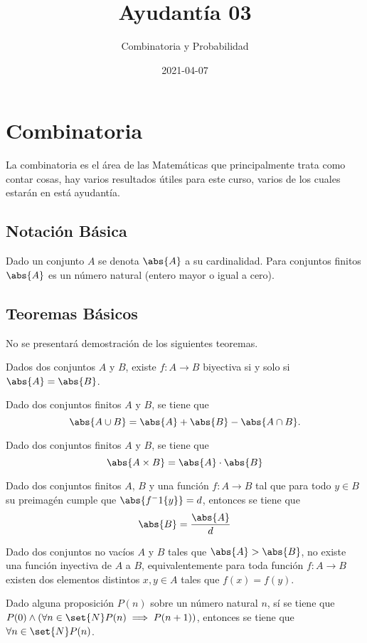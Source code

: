 \documentclass{ayudantia}
\title{Ayudantía 03}
\subtitle{Combinatoria y Probabilidad}
\date{2021-04-07}
\begin{document}
\maketitle
\section{Combinatoria}
La combinatoria es el área de las Matemáticas que principalmente trata como contar cosas, hay varios resultados útiles para este curso, varios de los cuales estarán en está ayudantía.
\subsection{Notación Básica}
\begin{defn}[Cardinalidad]
    Dado un conjunto \(A\) se denota \(\abs{A}\) a su cardinalidad. Para conjuntos finitos \(\abs{A}\) es un número natural (entero mayor o igual a cero).
\end{defn}
\subsection{Teoremas Básicos}
No se presentará demostración de los siguientes teoremas.
\begin{thm}[Biyección]
    Dados dos conjuntos \(A\) y \(B\), existe \(f:A\rightarrow B\) biyectiva si y solo si \(\abs{A}=\abs{B}\).
\end{thm}
\begin{thm}
    Dado dos conjuntos finitos \(A\) y \(B\), se tiene que 
    \begin{equation*}
        \abs{A\cup B}=\abs{A}+\abs{B}-\abs{A\cap B}.
    \end{equation*}
\end{thm}
\begin{thm}
    Dado dos conjuntos finitos \(A\) y \(B\), se tiene que
    \begin{equation*}
        \abs{A\times B}=\abs{A}\cdot\abs{B}
    \end{equation*}
\end{thm}
\begin{thm}
    Dado dos conjuntos finitos \(A\), \(B\) y una función \(f:A\rightarrow B\) tal que para todo \(y\in B\) su preimagén cumple que \(\abs{f^-1\{y\}}=d\), entonces se tiene que
    \begin{equation*}
        \abs{B}=\frac{\abs{A}}{d}
    \end{equation*}
\end{thm}
\begin{thm}
    Dado dos conjuntos no vacíos \(A\) y \(B\) tales que \(\abs{A}>\abs{B}\), no existe una función inyectiva de \(A\) a \(B\), equivalentemente para toda función \(f:A\rightarrow B\) existen dos elementos distintos \(x,y\in A\) tales que \(f(x)=f(y)\).
\end{thm}
\begin{thm}[Inducción]
    Dado alguna proposición \(P(n)\) sobre un número natural \(n\), sí se tiene que \(P(0)\wedge(\forall n\in\set{N}P(n)\implies P(n+1))\), entonces se tiene que \(\forall n\in\set{N}P(n)\). 
\end{thm}
\end{document}
